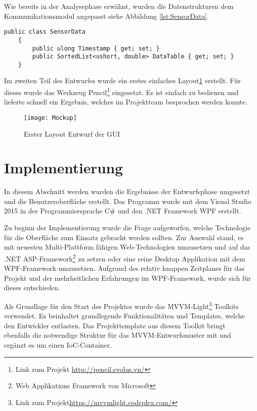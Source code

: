 Wie bereits in der Analysephase erwähnt, wurden die Datenstrukturen dem Kommunikationsmodul angepasst siehe Abbildung \ref{lst:SensorData}.\\
\begin{lstlisting}[frame=single, caption=Beschreibung der Sensordatenstruktur, label=lst:SensorData]
    public class SensorData
    {
        public ulong Timestamp { get; set; }
        public SortedList<ushort, double> DataTable { get; set; }
    }
\end{lstlisting}
Im zweiten Teil des Entwurfes wurde ein erstes einfaches Layout\ref{fig:gui} erstellt. Für dieses wurde das Werkzeug Pencil\footnote{Link zum Projekt \url{http://pencil.evolus.vn/}} eingesetzt. Es ist einfach zu bedienen und lieferte schnell ein Ergebnis, welches im Projektteam besprochen werden konnte.

\begin{figure}[h]
	\centering
		\texttt{[image: Mockup]}
		\caption{Erster Layout Entwurf der GUI}
		\label{fig:gui}
\end{figure}


\section{Implementierung}
In diesem Abschnitt werden wurden die Ergebnisse der Entwurfsphase umgesetzt und die Benutzeroberfläche erstellt. Das Programm wurde mit dem Visual Studio 2015 in der Programmiersprache C# und den .NET Framework WPF erstellt.

Zu beginn der Implementierung wurde die Frage aufgeworfen, welche Technologie für die Oberfläche zum Einsatz gebracht werden sollten. Zur Auswahl stand, es mit neuesten Multi-Plattform fähigen Web-Technologien umzusetzen und auf das .NET ASP-Framework\footnote{Web Applikations Framework von Microsoft} zu setzen oder eine reine Desktop Applikation mit dem WPF-Framework umzusetzen. Aufgrund des relativ knappen Zeitplanes für das Projekt und der mehrheitlichen Erfahrungen im WPF-Framework, wurde sich für dieses entschieden.

Als Grundlage für den Start des Projektes wurde das MVVM-Light\footnote{Link zum Projekt\url{https://mvvmlight.codeplex.com/}} Toolkits verwendet. Es beinhaltet grundlegende Funktionalitäten und Templates, welche den Entwickler entlasten. Das Projekttemplate aus diesem Toolkit bringt ebenfalls die notwendige Struktur für das MVVM-Entwurfsmuster mit und ergänzt es um einen IoC-Container.

